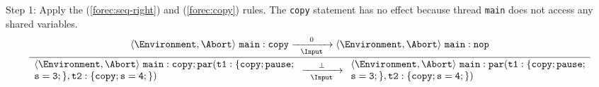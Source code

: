 \noindent
Step 1: Apply the (\ref{forec:seq-right}) and (\ref{forec:copy}) rules. The \verb$copy$ statement
has no effect because thread \verb$main$ does not access any shared variables.
\begin{equation*}
	\frac{
			\langle \Environment, \Abort \rangle ~ \mathtt{main: copy}
				\xrightarrow[~~\Input~~]{0} 
			\langle \Environment, \Abort \rangle ~ \mathtt{main: nop}
		}{
			\begin{array}{l}
				\langle \Environment, \Abort \rangle ~ \mathtt{main: copy; par(t1:\{copy; pause;}	\\
				\mathtt{s=3;\},t2:\{copy; s=4;\})}
			\end{array}
				\xrightarrow[~~\Input~~]{\bot} 
			\begin{array}{l}
				\langle \Environment, \Abort \rangle ~ \mathtt{main: par(t1:\{copy; pause;}			\\
				\mathtt{s=3;\},t2:\{copy; s=4;\})}
			\end{array}
		}
\end{equation*}

